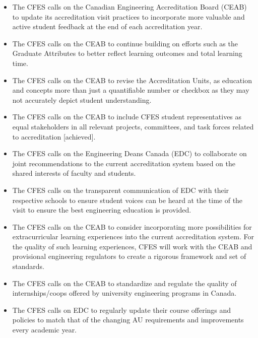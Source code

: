 \begin{itemize}
 \item The CFES calls on the Canadian Engineering Accreditation Board (CEAB) to update its accreditation visit practices to incorporate more valuable and active student feedback at the end of each accreditation year.
 \item The CFES calls on the CEAB to continue building on efforts such as the Graduate Attributes to better reflect learning outcomes and total learning time.
 \item The CFES calls on the CEAB to revise the Accreditation Units, as education and concepts more than just a quantifiable number or checkbox as they may not accurately depict student understanding.
 \item The CFES calls on the CEAB to include CFES student representatives as equal stakeholders in all relevant projects, committees, and task forces related to accreditation [achieved].
 \item The CFES calls on the Engineering Deans Canada (EDC) to collaborate on joint recommendations to the current accreditation system based on the shared interests of faculty and students.
 \item The CFES calls on the transparent communication of EDC with their respective schools to ensure student voices can be heard at the time of the visit to ensure the best engineering education is provided.
 \item The CFES calls on the CEAB to consider incorporating more possibilities for extracurricular learning experiences into the current accreditation system. For the quality of such learning experiences, CFES will work with the CEAB and provisional engineering regulators to create a rigorous framework and set of standards.
 \item The CFES calls on the CEAB to standardize and regulate the quality of internships/coops offered by university engineering programs in Canada.
 \item The CFES calls on EDC to regularly update their course offerings and policies to match that of the changing AU requirements and improvements every academic year.
\end{itemize}

